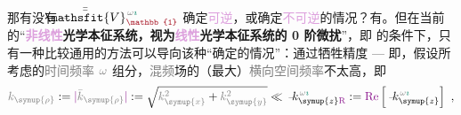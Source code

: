 那有没有 $\xint{\mathcolor{gray}{-}}{25}{\bar{\bar{\mathsfit{V}}}}^{\;\! \mathcolor{gray}{\omega} \textcolor{PineGreen}{\imath}}_{\textcolor{Maroon}{\mathbb{1}}}$ 确定\textcolor{Plum}{可逆}，或确定\textcolor{Plum}{不可逆}的情况？有。但在当前的“\textbf{\textcolor{Plum}{非线性}\textcolor{NavyBlue}{光学}\textcolor{PineGreen}{本征系统}，视为\textcolor{Plum}{线性}\textcolor{NavyBlue}{光学}\textcolor{PineGreen}{本征系统}的 \textcolor{NavyBlue}{0 阶微扰}}”，即  的条件下，只有一种比较通用的方法可以导向该种“确定的情况”：通过牺牲精度 --- 即，假设所考虑的\textcolor{gray}{时间频率} $\mathcolor{gray}{\omega}$ 组分，\textcolor{gray}{混频}场的（最大）\textcolor{gray}{横向}\textcolor{gray}{空间频率}不太高，即
\begin{align} \label{eq:k_rho<<k_z}
	\mathcolor{gray}{k_{\symup{\rho}}} := \textcolor{Plum}{\lvert} \mathcolor{gray}{\bar{k}_{\symup{\rho}}} \textcolor{Plum}{\textcolor{Plum}{\rvert}} := \sqrt{ \mathcolor{gray}{k^2_{\symup{x}}} + \mathcolor{gray}{k^2_{\symup{y}}} } \ll \xint{\begin{smallmatrix} ~ \\ {}^{}_{\mathcolor{gray}{-}} \\ ~ \end{smallmatrix}}{15}{k}_{\symup{z} \textcolor{Plum}{\text{R}}}^{\;\! \mathcolor{gray}{\omega} \textcolor{PineGreen}{\imath}} := \textcolor{Plum}{\text{Re}} \left[ \xint{\begin{smallmatrix} ~ \\ {}^{}_{\mathcolor{gray}{-}} \\ ~ \end{smallmatrix}}{15}{k}_{\symup{z}}^{\;\! \mathcolor{gray}{\omega} \textcolor{PineGreen}{\imath}} \right] ~,
\end{align}
